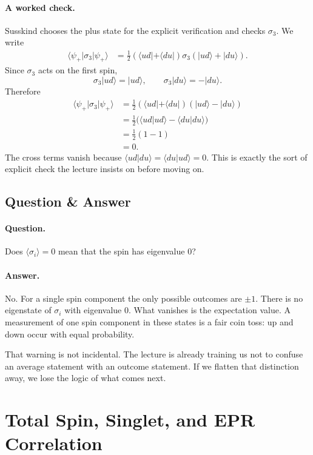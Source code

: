 \paragraph{A worked check.}
Susskind chooses the plus state for the explicit verification and checks \(\sigma_3\). We write
\begin{align}
\langle \psi_+|\sigma_3|\psi_+\rangle
&=
\frac{1}{2}
(\langle ud|+\langle du|)\sigma_3(|ud\rangle+|du\rangle).
\end{align}
Since \(\sigma_3\) acts on the first spin,
\[
\sigma_3|ud\rangle = |ud\rangle,
\qquad
\sigma_3|du\rangle = -|du\rangle.
\]
Therefore
\begin{align}
\langle \psi_+|\sigma_3|\psi_+\rangle
&=
\frac{1}{2}
(\langle ud|+\langle du|)(|ud\rangle-|du\rangle) \\
&=
\frac{1}{2}\bigl(\langle ud|ud\rangle-\langle du|du\rangle\bigr) \\
&=
\frac{1}{2}(1-1) \\
&= 0.
\end{align}
The cross terms vanish because \(\langle ud|du\rangle=\langle du|ud\rangle=0\). This is exactly the sort of explicit check the lecture insists on before moving on.

\subsection{Question \& Answer}

\paragraph{Question.} Does \(\langle \sigma_i\rangle = 0\) mean that the spin has eigenvalue \(0\)?

\paragraph{Answer.} No. For a single spin component the only possible outcomes are \(\pm 1\). There is no eigenstate of \(\sigma_i\) with eigenvalue \(0\). What vanishes is the expectation value. A measurement of one spin component in these states is a fair coin toss: up and down occur with equal probability.

That warning is not incidental. The lecture is already training us not to confuse an average statement with an outcome statement. If we flatten that distinction away, we lose the logic of what comes next.

\section{Total Spin, Singlet, and EPR Correlation}

